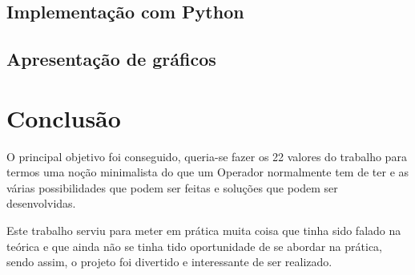 \documentclass[pdftex,12pt,a4paper]{report}
\begin{document}
\subsection{Implementação com Python}

\subsection{Apresentação de gráficos}

\newpage

\section{Conclusão}

O principal objetivo foi conseguido, queria-se fazer os 22 valores do trabalho para termos uma noção minimalista do que um Operador normalmente tem de ter e as várias possibilidades que podem ser feitas e soluções que podem ser desenvolvidas. 

Este trabalho serviu para meter em prática muita coisa que tinha sido falado na teórica e que ainda não se tinha tido oportunidade de se abordar na prática, sendo assim, o projeto foi divertido e interessante de ser realizado.
\end{document}
